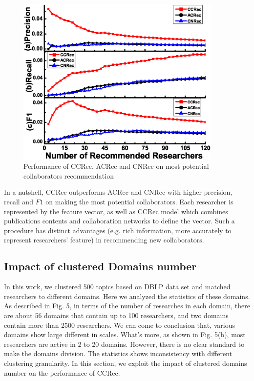 \documentclass[review]{elsarticle}
\begin{document}
%
\begin{figure}
\centering
\includegraphics [width=4in]{Fig4.eps}
\caption{Performance of CCRec, ACRec and CNRec on most potential collaborators recommendation}
\end{figure}

In a nutshell, CCRec outperforms ACRec and CNRec with higher precision, recall and $F1$ on making the most potential collaborators. Each researcher is represented by the feature vector, as well as CCRec model which combines publications contents and collaboration networks to define the vector. Such a procedure has distinct advantages (e.g. rich information, more accurately to represent researchers' feature) in recommending new collaborators.

\subsection{Impact of clustered Domains number}
In this work, we clustered 500 topics based on DBLP data set and matched researchers to different domains. Here we analyzed the statistics of these domains. As described in Fig. 5, in terms of the number of researches in each domain, there are about 56 domains that contain up to 100 researchers, and two domains contain more than 2500 researchers. We can come to conclusion that, various domains show large different in scales. What's more, as shown in Fig. 5(b), most researchers are active in 2 to 20 domains. However, there is no clear standard to make the domains division. The statistics shows inconsistency with different clustering granularity. In this section, we exploit the impact of clustered domains number on the performance of CCRec.
\end{document}
